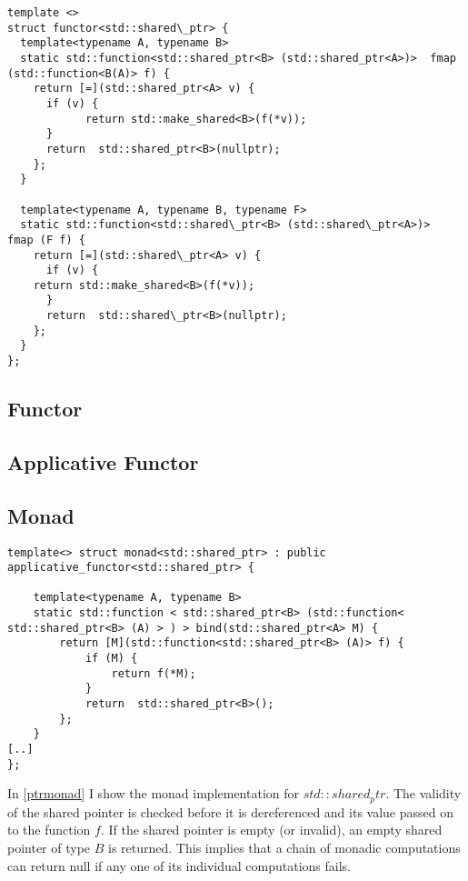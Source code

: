 \documentclass[12pt,fleqn]{article}
\begin{document}
%
%
%
\begin{minipage}{\linewidth}
\begin{lstlisting}[caption=shared pointer as container, label=shpfunctor]
template <>
struct functor<std::shared\_ptr> {
  template<typename A, typename B>
  static std::function<std::shared_ptr<B> (std::shared_ptr<A>)>  fmap (std::function<B(A)> f) {
    return [=](std::shared_ptr<A> v) {
      if (v) {
	        return std::make_shared<B>(f(*v)); 
      }
      return  std::shared_ptr<B>(nullptr);
    };
  }

  template<typename A, typename B, typename F>
  static std::function<std::shared\_ptr<B> (std::shared\_ptr<A>)>  fmap (F f) {
    return [=](std::shared\_ptr<A> v) {
      if (v) {
	return std::make_shared<B>(f(*v)); 
      }
      return  std::shared\_ptr<B>(nullptr);
    };
  }
};
\end{lstlisting}
\end{minipage}
%
%
%

   
%
\subsection{Functor}
   
%
\subsection{Applicative Functor}
 
   
%
\subsection{Monad}

%
%
%
\begin{minipage}{\linewidth}
\begin{lstlisting}[caption=monad implemention for std::shared\_ptr, label=ptrmonad]
template<> struct monad<std::shared_ptr> : public applicative_functor<std::shared_ptr> {

	template<typename A, typename B>
	static std::function < std::shared_ptr<B> (std::function< std::shared_ptr<B> (A) > ) > bind(std::shared_ptr<A> M) {
		return [M](std::function<std::shared_ptr<B> (A)> f) {
			if (M) {
				return f(*M);
			}
			return  std::shared_ptr<B>();
		};
	}
[..]
};
\end{lstlisting}
\end{minipage}
%
%
%

In \ref{ptrmonad} I show the monad implementation for $std::shared_ptr$. 
The validity of the shared pointer is checked before it is dereferenced and its value passed on to the function $f$.
If the shared pointer is empty (or invalid), an empty shared pointer of type $B$ is returned.
This implies that a chain of monadic computations can return null if any one of its individual computations fails.
\end{document}
